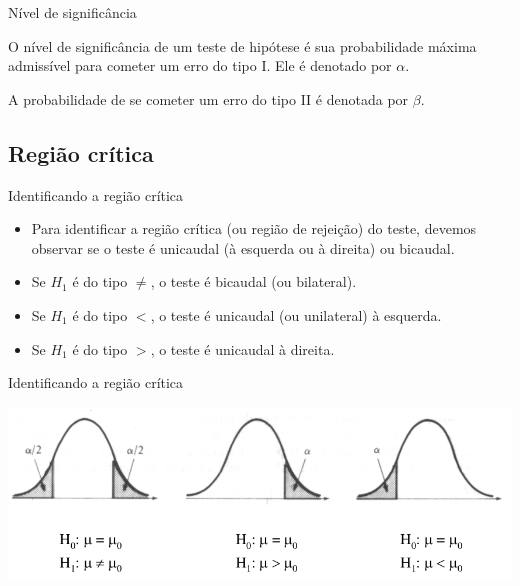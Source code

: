 \documentclass{beamer}
\begin{document}
\begin{frame}{Nível de significância}
  \begin{definition}
    O \alert{nível de significância} de um teste de hipótese é sua
    probabilidade máxima admissível para cometer um erro do tipo
    I. Ele é denotado por $\alpha$.
  \end{definition}
  \begin{definition}
    A probabilidade de se cometer um erro do tipo II é denotada por
    $\beta$.
  \end{definition}
\end{frame}

\subsection{Região crítica}

\begin{frame}{Identificando a região crítica}
  \begin{itemize}
  \item Para identificar a região crítica (ou região de rejeição) do
    teste, devemos observar se o teste é unicaudal (à esquerda ou à
    direita) ou bicaudal.
  \item Se $H_1$ é do tipo $\ne$, o teste é bicaudal (ou bilateral).
  \item Se $H_1$ é do tipo $<$, o teste é unicaudal (ou unilateral) à esquerda.
  \item Se $H_1$ é do tipo $>$, o teste é unicaudal à direita.
  \end{itemize}
\end{frame}

\begin{frame}{Identificando a região crítica}
  \begin{center}
    \includegraphics[width=\textwidth]{TH_I/regiao_critica2}
  \end{center}
\end{frame}
\end{document}
